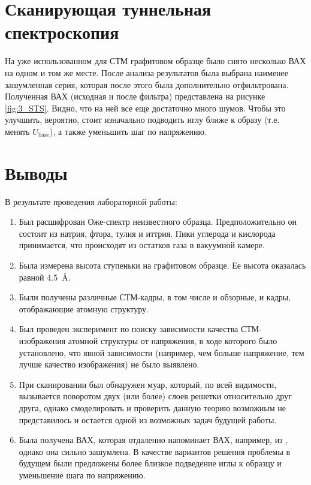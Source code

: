 \documentclass[a4paper, 12pt]{article}
\begin{document}
\section{Сканирующая туннельная спектроскопия}

На уже использованном для СТМ графитовом образце было снято несколько ВАХ на одном и том же месте. После анализа результатов была выбрана наименее зашумленная серия, которая после этого была дополнительно отфильтрована. Полученная ВАХ (исходная и после фильтра) представлена на рисунке \ref{fig:3_STS}. Видно, что на ней все еще достаточно много шумов. Чтобы это улучшить, вероятно, стоит изначально подводить иглу ближе к образу (т.е. менять $U_{\text{base}}$), а также уменьшить шаг по напряжению.

\section{Выводы}

В результате проведения лабораторной работы:

\begin{enumerate}
	\item Был расшифрован Оже-спектр неизвестного образца. Предположительно он состоит из натрия, фтора, тулия и иттрия. Пики углерода и кислорода принимается, что происходят из остатков газа в вакуумной камере.
	
	\item Была измерена высота ступеньки на графитовом образце. Ее высота оказалась равной 4.5~\AA.
	
	\item Были получены различные СТМ-кадры, в том числе и обзорные, и кадры, отображающие атомную структуру.
	
	\item Был проведен эксперимент по поиску зависимости качества СТМ-изображения атомной структуры от напряжения, в ходе которого было установлено, что явной зависимости (например, чем больше напряжение, тем лучше качество изображения) не было выявлено.
	
	\item При сканировании был обнаружен муар, который, по всей видимости, вызывается поворотом двух (или более) слоев решетки относительно друг друга, однако смоделировать и проверить данную теорию возможным не представилось и остается одной из возможных задач будущей работы.
	
	\item Была получена ВАХ, которая отдаленно напоминает ВАХ, например, из \cite{Article}, однако она сильно зашумлена. В качестве вариантов решения проблемы в будущем были предложены более близкое подведение иглы к образцу и уменьшение шага по напряжению.
\end{enumerate}
\end{document}
